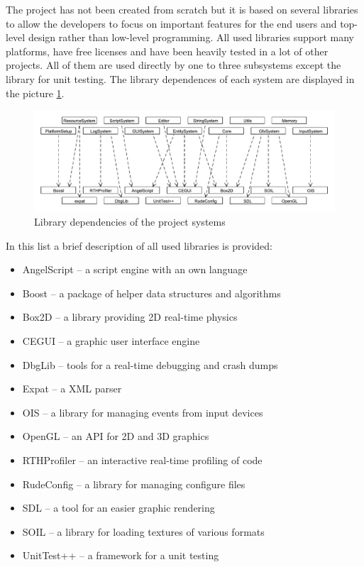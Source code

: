 \documentclass[a4paper, 12pt]{report}
\begin{document}
The project has not been created from scratch but it is based on several libraries to allow the developers to focus on important features for the end users and top-level design rather than low-level programming. All used libraries support many platforms, have free licenses and have been heavily tested in a lot of other projects. All of them are used directly by one to three subsystems except the library for unit testing. The library dependences of each system are displayed in the picture \ref{fig:library-dependence}.

\begin{figure}[htbp]
	\centering
		\includegraphics[width=1\textwidth]{LibraryDependence.pdf}
	\caption{Library dependencies of the project systems}
	\label{fig:library-dependence}
\end{figure}

In this list a brief description of all used libraries is provided:

\begin{itemize}
  \item AngelScript\cite{angelscript} -- a script engine with an own language
  \item Boost\cite{boost} -- a package of helper data structures and algorithms
  \item Box2D\cite{box2d} -- a library providing 2D real-time physics
  \item CEGUI\cite{cegui} -- a graphic user interface engine
  \item DbgLib\cite{dbglib} -- tools for a real-time debugging and crash dumps
  \item Expat\cite{expat} -- a XML parser
  \item OIS\cite{ois} -- a library for managing events from input devices
  \item OpenGL\cite{opengl} -- an API for 2D and 3D graphics
  \item RTHProfiler\cite{rthprofiler} -- an interactive real-time profiling of code
  \item RudeConfig\cite{rudeconfig} -- a library for managing configure files
  \item SDL\cite{sdl} -- a tool for an easier graphic rendering
  \item SOIL\cite{soil} -- a library for loading textures of various formats
  \item UnitTest++\cite{unittest} -- a framework for a unit testing
\end{itemize}
\end{document}
